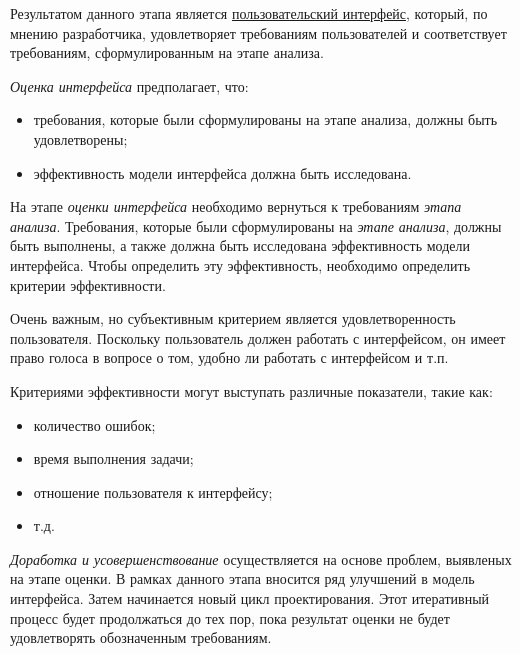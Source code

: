 Результатом данного этапа является \uline{пользовательский интерфейс}, который, по мнению разработчика, удовлетворяет требованиям пользователей и соответствует требованиям, сформулированным на этапе анализа.

\textit{Оценка интерфейса} предполагает, что:
\begin{itemize}
	\item требования, которые были сформулированы на этапе анализа, должны быть удовлетворены;
	\item эффективность модели интерфейса должна быть исследована.
\end{itemize}

На этапе \textit{оценки интерфейса} необходимо вернуться к требованиям \textit{этапа анализа}. Требования, которые
были сформулированы на \textit{этапе анализа}, должны быть выполнены, а также должна быть исследована эффективность модели интерфейса.
Чтобы определить эту эффективность, необходимо определить критерии эффективности.

Очень важным, но субъективным критерием является удовлетворенность пользователя. Поскольку пользователь должен работать с интерфейсом, он имеет право голоса в вопросе о том, удобно ли работать с интерфейсом и т.п.

Критериями эффективности могут выступать различные показатели, такие как:
\begin{itemize}
	\item количество ошибок;
	\item время выполнения задачи;
	\item отношение пользователя к интерфейсу;
	\item т.д.
\end{itemize}

\textit{Доработка и усовершенствование} осуществляется на основе проблем, выявленых на этапе оценки. В рамках данного этапа вносится ряд улучшений в модель интерфейса. Затем начинается новый цикл проектирования. Этот итеративный процесс будет продолжаться до тех пор, пока результат оценки не будет удовлетворять обозначенным требованиям. 


